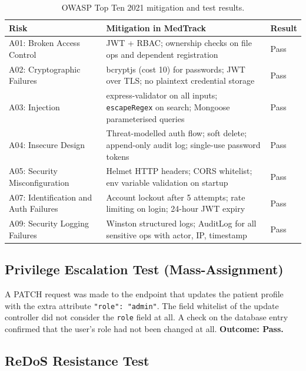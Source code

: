 \begin{table}[htbp]
  \centering
  \caption{OWASP Top Ten 2021 mitigation and test results.}
  \label{tab:owasp}
  \begin{tabularx}{\textwidth}{lXl}
    \hline
    \textbf{Risk} & \textbf{Mitigation in MedTrack} & \textbf{Result} \\
    \hline
    A01: Broken Access Control
      & JWT + RBAC; ownership checks on file ops and dependent
        registration
      & Pass \\
    A02: Cryptographic Failures
      & bcryptjs (cost 10) for passwords; JWT over TLS; no plaintext
        credential storage
      & Pass \\
    A03: Injection
      & express-validator on all inputs; \texttt{escapeRegex} on
        search; Mongoose parameterised queries
      & Pass \\
    A04: Insecure Design
      & Threat-modelled auth flow; soft delete; append-only audit
        log; single-use password tokens
      & Pass \\
    A05: Security Misconfiguration
      & Helmet HTTP headers; CORS whitelist; env variable validation
        on startup
      & Pass \\
    A07: Identification and Auth Failures
      & Account lockout after 5 attempts; rate limiting on login;
        24-hour JWT expiry
      & Pass \\
    A09: Security Logging Failures
      & Winston structured logs; AuditLog for all sensitive ops
        with actor, IP, timestamp
      & Pass \\
    \hline
  \end{tabularx}
\end{table}

\subsection{Privilege Escalation Test (Mass-Assignment)}

A PATCH request was made to the endpoint that updates the patient profile with the extra attribute \texttt{"role": "admin"}. The field whitelist of the update controller did not consider the \texttt{role} field at all. A check on the database entry confirmed that the user’s role had not been changed at all. \textbf{Outcome: Pass.}

\subsection{ReDoS Resistance Test}

